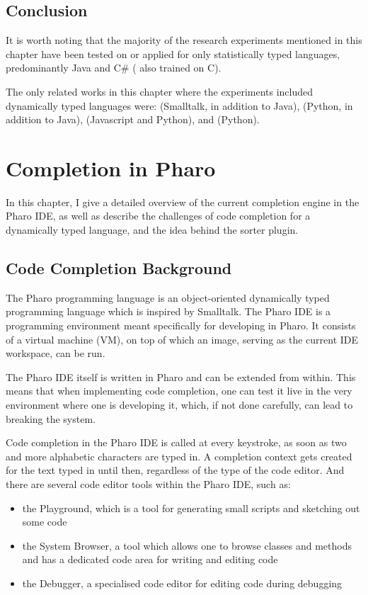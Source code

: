 \documentclass[sigplan,screen]{acmart}
\begin{document}
\subsection{Conclusion}
It is worth noting that the majority of the research experiments mentioned in this chapter have been tested on or applied for only statistically typed languages, predominantly Java and C\# (\cite{Hind12a} also trained on C).

The only related works in this chapter where the experiments included dynamically typed languages were: \cite{Robb08a} (Smalltalk, in addition to Java), \cite{Tu14a} (Python, in addition to Java), \cite{Li17a} (Javascript and Python), and \cite{Svya19a} (Python).

\section{Completion in Pharo}
In this chapter, I give a detailed overview of the current completion engine in the Pharo IDE, as well as describe the challenges of code completion for a dynamically typed language, and the idea behind the sorter plugin.

\subsection{Code Completion Background}
The Pharo programming language is an object-oriented dynamically typed programming language which is inspired by Smalltalk. The Pharo IDE is a programming environment meant specifically for developing in Pharo. It consists of a virtual machine (VM), on top of which an image, serving as the current IDE workspace, can be run.

The Pharo IDE itself is written in Pharo and can be extended from within. This means that when implementing code completion, one can test it live in the very environment where one is developing it, which, if not done carefully, can lead to breaking the system.

Code completion in the Pharo IDE is called at every keystroke, as soon as two and more alphabetic characters are typed in. A completion context gets created for the text typed in until then, regardless of the type of the code editor. And there are several code editor tools within the Pharo IDE, such as:
\begin{itemize}
    \item the Playground, which is a tool for generating small scripts and sketching out some code
    \item the System Browser, a tool which allows one to browse classes and methods and has a dedicated code area for writing and editing code
    \item the Debugger, a specialised code editor for editing code during debugging
\end{itemize}
\end{document}
